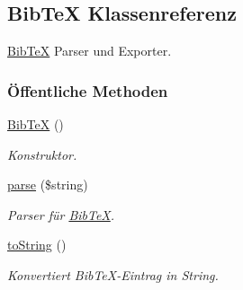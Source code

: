 \hypertarget{classBibTeX}{
\subsection{Bib\-Te\-X Klassenreferenz}
\label{classBibTeX}
}
\hyperlink{classBibTeX}{Bib\-Te\-X} Parser und Exporter.  


\subsubsection*{\"{O}ffentliche Methoden}
\begin{CompactItemize}
\item 
\hyperlink{classBibTeX_8f5bb42a792203a05dd14a55cd8e0fb3}{Bib\-Te\-X} ()
\begin{CompactList}\small\item\em Konstruktor. \item\end{CompactList}\item 
\hyperlink{classBibTeX_0fcfbb98f28eb1700cd6877116dc57f6}{parse} (\$string)
\begin{CompactList}\small\item\em Parser für \hyperlink{classBibTeX}{Bib\-Te\-X}. \item\end{CompactList}\item 
\hyperlink{classBibTeX_e656009bd9e0ddf6cf4076d7d76fe94c}{to\-String} ()
\begin{CompactList}\small\item\em Konvertiert Bib\-Te\-X-Eintrag in String. \item\end{CompactList}\end{CompactItemize}
